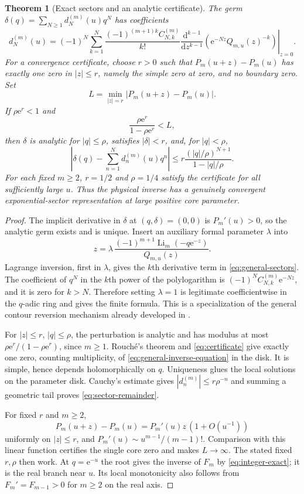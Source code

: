 \documentclass[11pt,a4paper]{article}
\newtheorem{theorem}{Theorem}[section]
\theoremstyle{definition}\newtheorem{definition}[theorem]{Definition}
\theoremstyle{remark}\newtheorem{remark}[theorem]{Remark}
\newcommand{\Li}{\operatorname{Li}}
\newcommand{\ee}{\mathrm e}
\numberwithin{equation}{section}
\begin{document}
\begin{theorem}[Exact sectors and an analytic certificate]\label{thm:general-inverse}
The germ $\delta(q)=\sum_{N\ge1}d_N^{(m)}(u)q^N$ has coefficients
\begin{equation}\label{eq:general-sectors}
 d_N^{(m)}(u)=(-1)^N\sum_{k=1}^N
  \frac{(-1)^{(m+1)k}C^{(m)}_{N,k}}{k!}
  \left.\frac{\mathrm d^{k-1}}{\mathrm dz^{k-1}}
       \left(\ee^{-Nz}Q_{m,u}(z)^{-k}\right)\right|_{z=0}.
\end{equation}
For a convergence certificate, choose $r>0$ such that
$P_m(u+z)-P_m(u)$ has exactly one zero in $|z|\le r$, namely the simple
zero at zero, and no boundary zero. Set
\[
 L=\min_{|z|=r}|P_m(u+z)-P_m(u)|.
\]
If $\rho\ee^r<1$ and
\begin{equation}\label{eq:certificate}
 \frac{\rho\ee^r}{1-\rho\ee^r}<L,
\end{equation}
then $\delta$ is analytic for $|q|\le\rho$, satisfies $|\delta|<r$, and,
for $|q|<\rho$,
\begin{equation}\label{eq:sector-remainder}
 \left|\delta(q)-\sum_{n=1}^N d_n^{(m)}(u)q^n\right|
   \le r\frac{(|q|/\rho)^{N+1}}{1-|q|/\rho}.
\end{equation}
For each fixed $m\ge2$, $r=1/2$ and $\rho=1/4$ satisfy the certificate
for all sufficiently large $u$. Thus the physical inverse has a genuinely
convergent exponential-sector representation at large positive core
parameter.
\end{theorem}
\begin{proof}
The implicit derivative in $\delta$ at $(q,\delta)=(0,0)$ is $P_m'(u)>0$,
so the analytic germ exists and is unique. Insert an auxiliary formal
parameter $\lambda$ into
\[
 z=\lambda\,
   \frac{(-1)^{m+1}\Li_m(-q\ee^{-z})}{Q_{m,u}(z)}.
\]
Lagrange inversion, first in $\lambda$, gives the $k$th derivative term in
\eqref{eq:general-sectors}. The coefficient of $q^N$ in the $k$th power
of the polylogarithm is $(-1)^NC^{(m)}_{N,k}\ee^{-Nz}$, and it is zero
for $k>N$. Therefore setting $\lambda=1$ is legitimate coefficientwise
in the $q$-adic ring and gives the finite formula. This is a specialization
of the general contour reversion mechanism already developed in
\cite{RepoTransport}.

For $|z|\le r$, $|q|\le\rho$, the perturbation is analytic and has
modulus at most $\rho\ee^r/(1-\rho\ee^r)$, since $m\ge1$.
Rouch\'e's theorem and \eqref{eq:certificate} give exactly one zero,
counting multiplicity, of \eqref{eq:general-inverse-equation} in the disk.
It is simple, hence depends holomorphically on $q$. Uniqueness glues the
local solutions on the parameter disk. Cauchy's estimate gives
$|d_n^{(m)}|\le r\rho^{-n}$ and summing a geometric tail proves
\eqref{eq:sector-remainder}.

For fixed $r$ and $m\ge2$,
\[
 P_m(u+z)-P_m(u)=P_m'(u)z\,(1+O(u^{-1}))
\]
uniformly on $|z|\le r$, and
$P_m'(u)\sim u^{m-1}/(m-1)!$. Comparison with this linear function
certifies the single core zero and makes $L\to\infty$.
The stated fixed $r,\rho$ then work. At $q=\ee^{-u}$ the root gives the
inverse of $F_m$ by \eqref{eq:integer-exact}; it is the real branch near
$u$. Its local monotonicity also follows from
$F_m'=F_{m-1}>0$ for $m\ge2$ on the real axis.
\end{proof}
\end{document}
